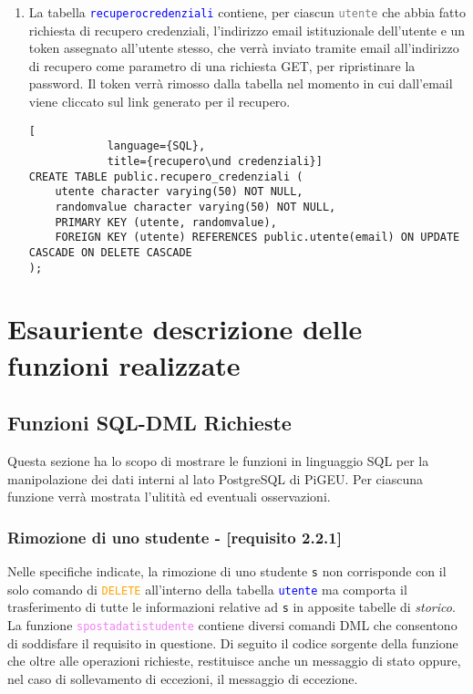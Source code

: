 \documentclass{article}
\newcommand{\tabb}[1]{\texttt{\textcolor{blue}{#1}}}
\newcommand{\attr}[1]{\texttt{\textcolor{gray}{#1}}}
\newcommand{\sqlcommand}[1]{\texttt{\textcolor{orange}{#1}}}
\newcommand{\sqlfunc}[1]{\texttt{\textcolor{violet}{#1}}}
\newcommand{\und}[0]{\textunderscore}
\begin{document}
\begin{enumerate}
        \pagebreak

        \begin{lstlisting}[
            language={SQL},
            title={foto\und profilo}]
CREATE TABLE public.foto_profilo (
    utente character varying(50) NOT NULL,
    path character varying(200),
    "timestamp" timestamp(6) without time zone NOT NULL,
    PRIMARY KEY (utente, "timestamp"),
    FOREIGN KEY (utente) REFERENCES public.utente(email) ON UPDATE CASCADE ON DELETE CASCADE
);
        \end{lstlisting}

        \item La tabella \tabb{recupero\und credenziali} contiene, per ciascun \attr{utente} che abbia fatto richiesta di recupero credenziali, l'indirizzo email istituzionale dell'utente e un token assegnato all'utente stesso, che verrà inviato tramite email all'indirizzo di recupero come parametro di una richiesta GET, per ripristinare la password. Il token verrà rimosso dalla tabella nel momento in cui dall'email viene cliccato sul link generato per il recupero.
        \begin{lstlisting}[
            language={SQL},
            title={recupero\und credenziali}]
CREATE TABLE public.recupero_credenziali (
    utente character varying(50) NOT NULL,
    randomvalue character varying(50) NOT NULL,
    PRIMARY KEY (utente, randomvalue),
    FOREIGN KEY (utente) REFERENCES public.utente(email) ON UPDATE CASCADE ON DELETE CASCADE
);
        \end{lstlisting}
    \end{enumerate}

    \pagebreak

    \section{Esauriente descrizione delle funzioni realizzate}
    \subsection{Funzioni SQL-DML Richieste}
    Questa sezione ha lo scopo di mostrare le funzioni in linguaggio SQL per la manipolazione dei dati interni al lato PostgreSQL di PiGEU. Per ciascuna funzione verrà mostrata l'ulitità ed eventuali osservazioni.
    \subsubsection{Rimozione di uno studente - [requisito 2.2.1]}
    Nelle specifiche indicate, la rimozione di uno studente \texttt{s} non corrisponde con il solo comando di \sqlcommand{DELETE} all'interno della tabella \tabb{utente} ma comporta il trasferimento di tutte le informazioni relative ad \texttt{s} in apposite tabelle di \textit{storico}. La funzione \sqlfunc{sposta\und dati\und studente} contiene diversi comandi DML che consentono di soddisfare il requisito in questione. Di seguito il codice sorgente della funzione che oltre alle operazioni richieste, restituisce anche un messaggio di stato oppure, nel caso di sollevamento di eccezioni, il messaggio di eccezione.
\end{document}
